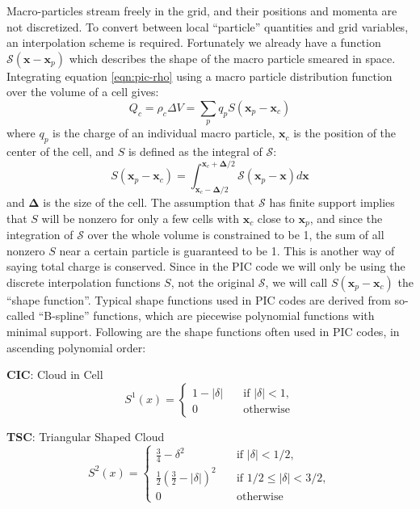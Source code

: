 Macro-particles stream freely in the grid, and their positions and momenta are
not discretized. To convert between local ``particle'' quantities and grid
variables, an interpolation scheme is required. Fortunately we already have a
function $\mathcal{S}(\mathbf{x} - \mathbf{x}_p)$ which describes the shape of
the macro particle smeared in space. Integrating equation \eqref{eqn:pic-rho}
using a macro particle distribution function over the volume of a cell gives:
\begin{equation}
  \label{eqn:rho-cell}
  Q_{c} = \rho_{c}\Delta V = \sum_pq_pS(\mathbf{x}_p-\mathbf{x}_{c})
\end{equation}
where $q_p$ is the charge of an individual macro particle, $\mathbf{x}_{c}$ is
the position of the center of the cell, and $S$ is defined as
the integral of $\mathcal{S}$:
\begin{equation}
  \label{eqn:weight-function}
  S(\mathbf{x}_p - \mathbf{x}_c) = \int_{\mathbf{x}_c - \bm{\Delta}/2}^{\mathbf{x}_c + \bm{\Delta}/2} \mathcal{S}(\mathbf{x}_p - \mathbf{x})d\mathbf{x}
\end{equation}
and $\bm{\Delta}$ is the size of the cell. The assumption that $\mathcal{S}$ has
finite support implies that $S$ will be nonzero for only a few cells with
$\mathbf{x}_{c}$ close to $\mathbf{x}_{p}$, and since the integration of
$\mathcal{S}$ over the whole volume is constrained to be 1, the sum of all
nonzero $S$ near a certain particle is guaranteed to be 1. This is another way
of saying total charge is conserved. Since in the PIC code we will only be
using the discrete interpolation functions $S$, not the original $\mathcal{S}$,
we will call $S(\mathbf{x}_p - \mathbf{x}_c)$ the ``shape function''.
Typical shape functions used in PIC codes are derived from so-called
``B-spline'' functions, which are piecewise polynomial functions with minimal
support. Following are the shape functions often used in PIC codes, in ascending
polynomial order:

\textbf{CIC}: Cloud in Cell
\begin{equation}
  \label{eq:first-order-deposit}
  S^1(x) = \begin{cases}
    \displaystyle 1 - |\delta| & \quad \text{if } |\delta| < 1, \\
    \displaystyle 0            & \quad \text{otherwise}
  \end{cases}
\end{equation}

\textbf{TSC}: Triangular Shaped Cloud
\begin{equation}
  \label{eq:second-order-deposit}
  S^2(x) =
  \begin{cases}
    \displaystyle \frac{3}{4} - \delta^2 & \quad \text{if } |\delta| < 1/2, \\
    \displaystyle \frac{1}{2} \left( \frac{3}{2} - |\delta| \right)^2 & \quad \text{if } 1/2 \leq |\delta| < 3/2, \\
    \displaystyle 0                      & \quad \text{otherwise}
  \end{cases}
\end{equation}

